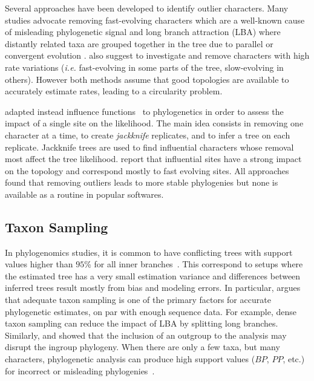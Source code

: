 Several approaches have been developed to identify outlier characters. Many studies \citep{Rodriguez-Ezpeleta2007, Burleigh2004} advocate removing fast-evolving characters which are a well-known cause of misleading phylogenetic signal and long branch attraction (LBA) where distantly related taxa are grouped together in the tree due to parallel or convergent evolution \citep{Felsenstein1978}. \citet{Lopez1999} also suggest to investigate and remove characters with high rate variations (\emph{i.e.} fast-evolving in some parts of the tree, slow-evolving in others). However both methods assume that good topologies are available to accurately estimate rates, leading to a circularity problem. 

\citet{Bar-Hen2008} adapted instead influence functions~\citep{Hampel1974} to phylogenetics in order to assess the impact of a single site on the likelihood. The main idea consists in removing one character at a time, to create \emph{jackknife} replicates, and to infer a tree on each replicate. Jackknife trees are used to find influential characters whose removal most affect the tree likelihood. \citet{Bar-Hen2008} report that influential sites have a strong impact on the topology and correspond mostly to fast evolving sites. All approaches found that removing outliers leads to more stable phylogenies but none is available as a routine in popular softwares. 

\subsection{Taxon Sampling} \label{sec:rogue-taxa}

In phylogenomics studies, it is common to have conflicting trees with support values higher than $95$\% for all inner branches~\citep{Rydin2002}. This correspond to setups where the estimated tree has a very small estimation variance and differences between inferred trees result mostly from bias and modeling errors. In particular, \citet{Swofford1996} argues that adequate taxon sampling is one of the primary factors for accurate phylogenetic estimates, on par with enough sequence data. For example, dense taxon sampling can reduce the impact of LBA by splitting long branches. Similarly, \citet{Holland2003} and \citet{Shavit2007} showed that the inclusion of an outgroup to the analysis may disrupt the ingroup phylogeny. When there are only a few taxa, but many characters, phylogenetic analysis can produce high support values ($BP$, $PP$, etc.) for incorrect or misleading phylogenies~\citep{Rokas2003, Rokas2005, Heath2008}.

